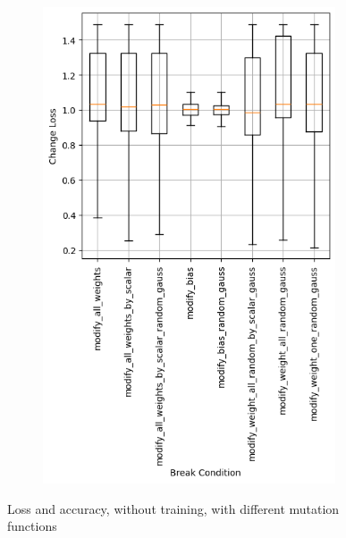 \begin{figure}
\begin{subfigure}{0.5\textwidth}
        \includegraphics[width=0.95\textwidth]{plots/Mutatation_NotTrained_loss.png}
    \end{subfigure}
    \caption{Loss and accuracy, without training, with different mutation functions}
    \label{fig:mutation-functions-notraining}
\end{figure}